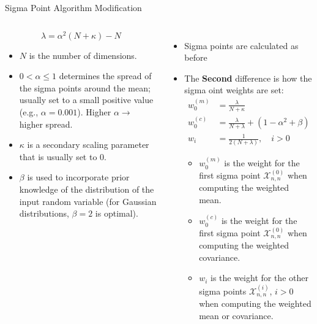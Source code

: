 \begin{frame}{Sigma Point Algorithm Modification}
\begin{columns}
\begin{itemize}
        \begin{equation*}
        \boxed{
        \lambda = \alpha^2 (N + \kappa) - N
        }
        \end{equation*}
        \vspace{-5pt}
        \begin{itemize}
            \item $N$ is the number of dimensions.
            \item $0<\alpha\leq 1$ determines the spread of the sigma points around the mean; usually set to a small positive value (e.g., $\alpha = 0.001$). Higher $\alpha \rightarrow$ higher spread. 
            \item $\kappa$ is a secondary scaling parameter that is usually set to 0.
            \item $\beta$ is used to incorporate prior knowledge of the distribution of the input random variable (for Gaussian distributions, $\beta = 2$ is optimal).
        \end{itemize}
        \end{itemize}
         \begin{itemize}
            \item Sigma points are calculated as before
            \item The \textbf{Second} difference is how the sigma oint weights are set:
            \begin{align*}
                w^{(m)}_0 &= \frac{\lambda}{N + \kappa} \\
                w^{(c)}_0 &= \frac{\lambda}{N + \lambda} + (1 - \alpha^2 + \beta) \\
                w_i &= \frac{1}{2(N + \lambda)}, \quad i > 0
                \end{align*}
                \begin{itemize}
                    \item $w^{(m)}_0$ is the weight for the first sigma point $\mathbf{\mathcal{X}}^{(0)}_{n,n}$ when computing the weighted mean.
                    \item $w^{(c)}_0$ is the weight for the first sigma point $\mathbf{\mathcal{X}}^{(0)}_{n,n}$ when computing the weighted covariance.
                    \item $w_i$ is the weight for the other sigma points $\mathbf{\mathcal{X}}^{(i)}_{n,n}$, $i > 0$ when computing the weighted mean or covariance.
                \end{itemize}
         \end{itemize}
\end{columns}    
\end{frame}

